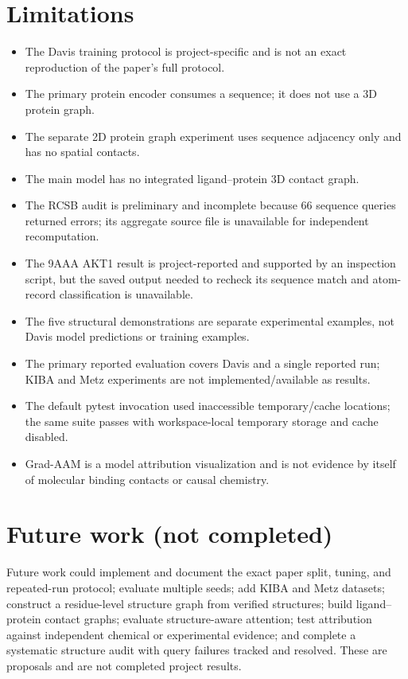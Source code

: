 \section{Limitations}
\begin{itemize}
\item The Davis training protocol is project-specific and is not an exact reproduction of the paper's full protocol.
\item The primary protein encoder consumes a sequence; it does not use a 3D protein graph.
\item The separate 2D protein graph experiment uses sequence adjacency only and has no spatial contacts.
\item The main model has no integrated ligand--protein 3D contact graph.
\item The RCSB audit is preliminary and incomplete because 66 sequence queries returned errors; its aggregate source file is unavailable for independent recomputation.
\item The 9AAA AKT1 result is project-reported and supported by an inspection script, but the saved output needed to recheck its sequence match and atom-record classification is unavailable.
\item The five structural demonstrations are separate experimental examples, not Davis model predictions or training examples.
\item The primary reported evaluation covers Davis and a single reported run; KIBA and Metz experiments are not implemented/available as results.
\item The default pytest invocation used inaccessible temporary/cache locations; the same suite passes with workspace-local temporary storage and cache disabled.
\item Grad-AAM is a model attribution visualization and is not evidence by itself of molecular binding contacts or causal chemistry.
\end{itemize}

\section{Future work (not completed)}
Future work could implement and document the exact paper split, tuning, and repeated-run protocol; evaluate multiple seeds; add KIBA and Metz datasets; construct a residue-level structure graph from verified structures; build ligand--protein contact graphs; evaluate structure-aware attention; test attribution against independent chemical or experimental evidence; and complete a systematic structure audit with query failures tracked and resolved. These are proposals and are not completed project results.

